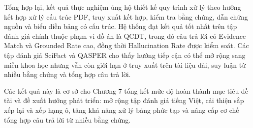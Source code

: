 \documentclass[../DoAn.tex]{subfiles}
\begin{document}
Tổng hợp lại, kết quả thực nghiệm ủng hộ thiết kế quy trình xử lý theo hướng kết hợp xử lý cấu trúc PDF, truy xuất kết hợp, kiểm tra bằng chứng, dẫn chứng nguồn và biểu diễn bảng có cấu trúc. Hệ thống đạt kết quả tốt nhất trên tập đánh giá chính thuộc phạm vi đồ án là QCDT, trong đó câu trả lời có Evidence Match và Grounded Rate cao, đồng thời Hallucination Rate được kiểm soát. Các tập đánh giá SciFact và QASPER cho thấy hướng tiếp cận có thể mở rộng sang miền khoa học nhưng vẫn còn giới hạn ở truy xuất trên tài liệu dài, suy luận từ nhiều bằng chứng và tổng hợp câu trả lời.

Các kết quả này là cơ sở cho Chương 7 tổng kết mức độ hoàn thành mục tiêu đề tài và đề xuất hướng phát triển: mở rộng tập đánh giá tiếng Việt, cải thiện sắp xếp lại và xếp hạng ô, tăng khả năng xử lý bảng phức tạp và nâng cấp cơ chế tổng hợp câu trả lời từ nhiều bằng chứng.
\end{document}
